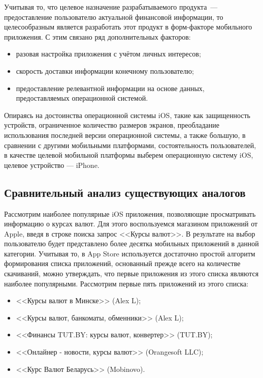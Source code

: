 Учитывая то, что целевое назначение разрабатываемого продукта~--- предоставление
пользователю актуальной финансовой информации, то целесообразным является
разработать этот продукт в форм-факторе мобильного приложения. С этим связано
ряд дополнительных факторов:
\begin{itemize}
  \item разовая настройка приложения с учётом личных интересов;
  \item скорость доставки информации конечному пользователю;
  \item предоставление релевантной информации на основе данных,
    предоставляемых операционной системой.
\end{itemize}

Опираясь на достоинства операционной системы iOS, такие как защищенность
устройств, ограниченное количество размеров экранов, преобладание
использования последней версии операционной системы, а также большую, в сравнении
с другими мобильными платформами, состоятельность пользователей, в качестве
целевой мобильной платформы выберем операционную систему iOS, целевое устройство ---
iPhone.


\subsection{Сравнительный анализ существующих аналогов}

Рассмотрим наиболее популярные iOS приложения, позволяющие просматривать
информацию о курсах валют. Для этого воспользуемся магазином приложений от Apple,
введя в строке поиска запрос <<Курсы валют>>. В результате на выбор
пользователю будет представлено более десятка мобильных приложений в данной
категории. Учитывая то, в App Store используется достаточно
простой алгоритм формирования списка приложений, основанный прежде всего на
количестве скачиваний, можно утверждать, что первые приложения из этого списка
являются наиболее популярными. Рассмотрим первые пять приложений из этого
списка:
\begin{itemize}
  \item <<Курсы валют в Минске>> (Alex L);
  \item <<Курсы валют, банкоматы, обменники>> (Alex L);
  \item <<Финансы TUT.BY: курсы валют, конвертер>> (TUT.BY);
  \item <<Онлайнер - новости, курсы валют>> (Orangesoft LLC);
  \item <<Курс Валют Беларусь>> (Mobinovo).
\end{itemize}

